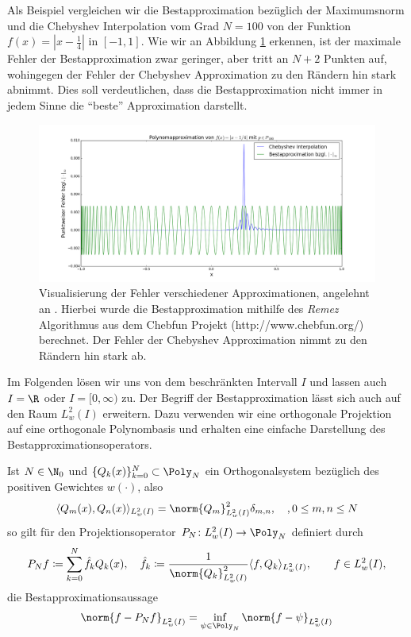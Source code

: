 \begin{mathbsp}
Als Beispiel vergleichen wir die Bestapproximation bezüglich der Maximumsnorm und die Chebyshev Interpolation vom Grad $N=100$ von der Funktion $f(x)=|x-\frac{1}{4}|$ in $[-1,1]$. Wie wir an Abbildung \ref{polyapproxcomp} erkennen, ist der maximale Fehler der Bestapproximation zwar geringer, aber tritt an $N+2$ Punkten auf, wohingegen der Fehler der Chebyshev Approximation zu den Rändern hin stark abnimmt. Dies soll verdeutlichen, dass die Bestapproximation nicht immer in jedem Sinne die "`beste"' Approximation darstellt.
\begin{figure}[ht]
 \center
 \includegraphics[width=\linewidth]{Figures/polynomial_approx_comparison.png}
 \caption{Visualisierung der Fehler verschiedener Approximationen, angelehnt an \autocite{Trefethen}. Hierbei wurde die Bestapproximation mithilfe des \emph{Remez} Algorithmus aus dem Chebfun Projekt (http://www.chebfun.org/) berechnet. Der Fehler der Chebyshev Approximation nimmt zu den Rändern hin stark ab.}
 \label{polyapproxcomp}
\end{figure}
\end{mathbsp}
Im Folgenden lösen wir uns von dem beschränkten Intervall $I$ und lassen auch $I=\R$ oder $I=[0,\infty)$ zu. Der Begriff der Bestapproximation lässt sich auch auf den Raum $L_w^2(I)$ erweitern. Dazu verwenden wir eine orthogonale Projektion auf eine orthogonale Polynombasis und erhalten eine einfache Darstellung des Bestapproximationsoperators.
\begin{maththeorem}
Ist $N\in\N_0$ und $\lbrace Q_k(x)\rbrace_{k=0}^N\subset \Poly_N$ ein Orthogonalsystem bezüglich des positiven Gewichtes $w(\cdot)$, also 
\[\langle Q_m(x),Q_n(x)\rangle_{L_w^2(I)}=\norm{Q_m}^2_{L_w^2(I)}\delta_{m,n},\quad, 0\le m,n\le N\]
so gilt für den Projektionsoperator $P_N\colon L_w^2(I)\to \Poly_N$ definiert durch 
\[P_Nf\coloneqq \sum_{k=0}^N\hat{f}_kQ_k(x),\quad \hat{f}_k\coloneqq \frac{1}{\norm{Q_k}_{L_w^2(I)}^2}\langle f,Q_k\rangle_{L_w^2(I)},\qquad f\in L^2_w(I),\]
die Bestapproximationsaussage
\[\norm{f-P_Nf}_{L_w^2(I)}=\inf\limits_{\psi\in\Poly_N}\norm{f-\psi}_{L_w^2(I)}\]
\end{maththeorem}

